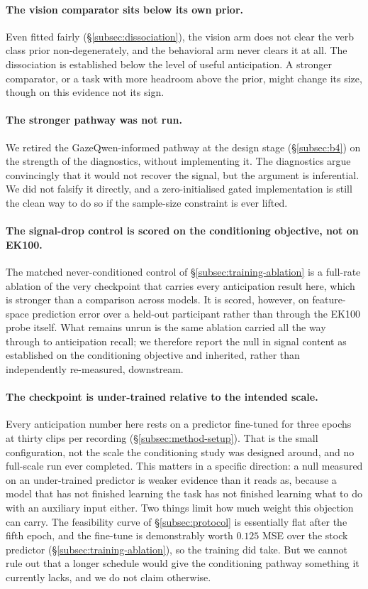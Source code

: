 \paragraph{The vision comparator sits below its own prior.}
Even fitted fairly (\S\ref{subsec:dissociation}), the vision arm does not clear
the verb class prior non-degenerately, and the behavioral arm never clears it at
all. The dissociation is established below the level of useful anticipation. A
stronger comparator, or a task with more headroom above the prior, might change
its size, though on this evidence not its sign.

\paragraph{The stronger pathway was not run.}
We retired the GazeQwen-informed pathway at the design stage
(\S\ref{subsec:b4}) on the strength of the diagnostics, without implementing it.
The diagnostics argue convincingly that it would not recover the signal, but the
argument is inferential. We did not falsify it directly, and a zero-initialised
gated implementation is still the clean way to do so if the sample-size
constraint is ever lifted.

\paragraph{The signal-drop control is scored on the conditioning objective, not on EK100.}
The matched never-conditioned control of \S\ref{subsec:training-ablation} is a
full-rate ablation of the very checkpoint that carries every anticipation result
here, which is stronger than a comparison across models. It is scored, however, on
feature-space prediction error over a held-out participant rather than through the
EK100 probe itself. What remains unrun is the same ablation carried all the way
through to anticipation recall; we therefore report the null in signal content as
established on the conditioning objective and inherited, rather than
independently re-measured, downstream.

\paragraph{The checkpoint is under-trained relative to the intended scale.}
Every anticipation number here rests on a predictor fine-tuned for three epochs at
thirty clips per recording (\S\ref{subsec:method-setup}). That is the small
configuration, not the scale the conditioning study was designed around, and no
full-scale run ever completed. This matters in a specific direction: a null
measured on an under-trained predictor is weaker evidence than it reads as,
because a model that has not finished learning the task has not finished learning
what to do with an auxiliary input either. Two things limit how much weight this
objection can carry. The feasibility curve of \S\ref{subsec:protocol} is
essentially flat after the fifth epoch, and the fine-tune is demonstrably worth
$0.125$ MSE over the stock predictor (\S\ref{subsec:training-ablation}), so the
training did take. But we cannot rule out that a longer schedule would give the
conditioning pathway something it currently lacks, and we do not claim otherwise.

